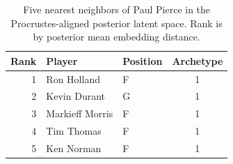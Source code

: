 \begin{table}[htbp]
  \centering\small
  \begin{tabular}{rllc}
    \toprule
    Rank & Player & Position & Archetype \\
    \midrule
    1 & Ron Holland & F & 1 \\
    2 & Kevin Durant & G & 1 \\
    3 & Markieff Morris & F & 1 \\
    4 & Tim Thomas & F & 1 \\
    5 & Ken Norman & F & 1 \\
    \bottomrule
  \end{tabular}
  \caption{Five nearest neighbors of Paul Pierce in the Procrustes-aligned posterior latent space. Rank is by posterior mean embedding distance.}
  \label{tab:Paul_Pierce_neighbors}
\end{table}

